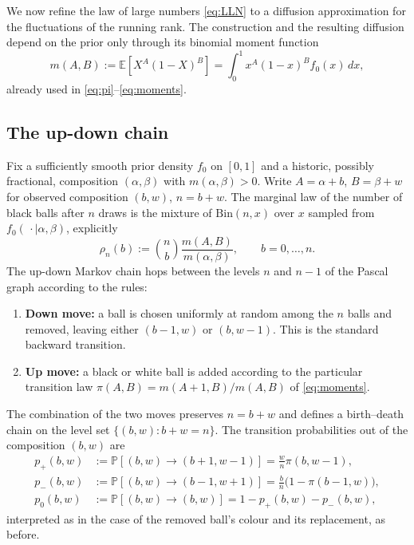 \documentclass[11pt,reqno]{amsart}
\theoremstyle{definition}
\theoremstyle{remark}
\numberwithin{equation}{section}
\begin{document}
We now refine the law of large numbers \eqref{eq:LLN} to a diffusion approximation for the fluctuations of the running rank. The construction and the resulting diffusion depend on the prior only through its binomial moment function
\[
m(A,B):=\mathbb{E}[X^A(1-X)^B]=\int_0^1 x^A(1-x)^B f_0(x)\,dx,
\]
already used in \eqref{eq:pi}--\eqref{eq:moments}.

\subsection{The up-down chain}

Fix a sufficiently smooth prior density \(f_0\) on \([0,1]\) and a historic, possibly fractional, composition \((\alpha,\beta)\) with \(m(\alpha,\beta)>0\). Write \(A=\alpha+b\), \(B=\beta+w\) for observed composition \((b,w)\), \(n=b+w\). The marginal law of the number of black balls after \(n\) draws is the mixture of \(\mathrm{Bin}(n,x)\) over \(x\) sampled from \(f_0(\,\cdot\mid\alpha,\beta)\), explicitly
\begin{equation}\label{eq:rho}
\rho_n(b):=\binom{n}{b}\frac{m(A,B)}{m(\alpha,\beta)},\qquad b=0,\dots,n.
\end{equation}
The up-down Markov chain hops between the levels \(n\) and \(n-1\) of the Pascal graph according to the rules:

\begin{enumerate}[label=(\roman*)]
\item \textbf{Down move:} a ball is chosen uniformly at random among the \(n\) balls and removed, leaving either \((b-1,w)\) or \((b,w-1)\). This is the standard backward transition.
\item \textbf{Up move:} a black or white ball is added according to the particular transition law \(\pi(A,B)=m(A+1,B)/m(A,B)\) of \eqref{eq:moments}.
\end{enumerate}

The combination of the two moves preserves \(n=b+w\) and defines a birth--death chain on the level set \(\{(b,w):b+w=n\}\). The transition probabilities out of the composition \((b,w)\) are
\begin{align}
p_+(b,w)&:=\mathbb{P}[(b,w)\to(b+1,w-1)]=\frac{w}{n}\pi(b,w-1),\label{eq:p+}\\
p_-(b,w)&:=\mathbb{P}[(b,w)\to(b-1,w+1)]=\frac{b}{n}\bigl(1-\pi(b-1,w)\bigr),\label{eq:p-}\\
p_0(b,w)&:=\mathbb{P}[(b,w)\to(b,w)]=1-p_+(b,w)-p_-(b,w),\label{eq:p0}
\end{align}
interpreted as in the case of the removed ball's colour and its replacement, as before.
\end{document}
